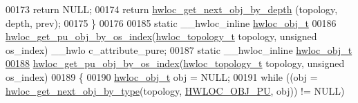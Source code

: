 \begin{DoxyCode}
00173     \textcolor{keywordflow}{return} NULL;
00174   \textcolor{keywordflow}{return} \hyperlink{a00053_gab7c1dce3f42ece5bfa621e87cf332418}{hwloc_get_next_obj_by_depth} (topology, depth, prev);
00175 \}
00176 
00185 \textcolor{keyword}{static} \_\_hwloc\_inline \hyperlink{a00016}{hwloc_obj_t}
00186 \hyperlink{a00053_ga0bc54225b65d557c70c7cb5dfb714de7}{hwloc_get_pu_obj_by_os_index}(\hyperlink{a00039_ga9d1e76ee15a7dee158b786c30b6a6e38}{hwloc_topology_t} topology, \textcolor{keywordtype}{unsigned} os\_index) \_\_hwlo
      c\_attribute\_pure;
00187 \textcolor{keyword}{static} \_\_hwloc\_inline \hyperlink{a00016}{hwloc_obj_t}
\hypertarget{a00031_source_l00188}{}\hyperlink{a00053_ga0bc54225b65d557c70c7cb5dfb714de7}{00188} \hyperlink{a00053_ga0bc54225b65d557c70c7cb5dfb714de7}{hwloc_get_pu_obj_by_os_index}(\hyperlink{a00039_ga9d1e76ee15a7dee158b786c30b6a6e38}{hwloc_topology_t} topology, \textcolor{keywordtype}{unsigned} os\_index)
00189 \{
00190   \hyperlink{a00016}{hwloc_obj_t} obj = NULL;
00191   \textcolor{keywordflow}{while} ((obj = \hyperlink{a00053_ga5f08ceb69375341e73563cfe2e77534e}{hwloc_get_next_obj_by_type}(topology, \hyperlink{a00041_ggacd37bb612667dc437d66bfb175a8dc55abca6887e80cb291353b0a0c1da83f661}{HWLOC_OBJ_PU}, obj)) != NULL)
      

\end{DoxyCode}
